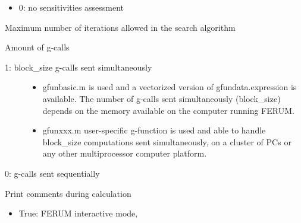 \documentclass[letterpaper,10pt,english]{sphinxmanual}
\begin{document}
\begin{fulllineitems}
\begin{fulllineitems}
\begin{description}
\begin{itemize}
\item {} 
0: no sensitivities assessment

\end{itemize}

\end{description}

\end{fulllineitems}


\begin{fulllineitems}
\label{model:pyre.model.AnalysisOptions.i_max}
Maximum number of iterations allowed in the search algorithm

\end{fulllineitems}


\begin{fulllineitems}
\label{model:pyre.model.AnalysisOptions.multi_proc}
Amount of g-calls
\begin{description}
\item[{1: block\_size g-calls sent simultaneously}] \leavevmode\begin{itemize}
\item {} 
gfunbasic.m is used and a vectorized version of gfundata.expression
is available. The number of g-calls sent simultaneously (block\_size)
depends on the memory available on the computer running FERUM.

\item {} 
gfunxxx.m user-specific g-function is used and able to handle
block\_size computations            sent simultaneously, on a cluster
of PCs or any other multiprocessor computer platform.

\end{itemize}

\end{description}

0: g-calls sent sequentially

\end{fulllineitems}


\begin{fulllineitems}
\label{model:pyre.model.AnalysisOptions.print_output}
Print comments during calculation
\begin{itemize}
\item {} 
True: FERUM interactive mode,


\end{itemize}
\end{fulllineitems}
\end{fulllineitems}
\end{document}
